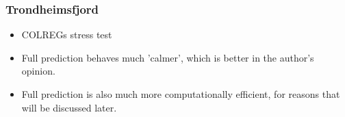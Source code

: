 \subsubsection{Trondheimsfjord}
\begin{itemize}
    \item COLREGs stress test
    \item Full prediction behaves much 'calmer', which is better in the author's opinion.
    \item Full prediction is also much more computationally efficient, for reasons that will be discussed later.
\end{itemize}
\clearpage
